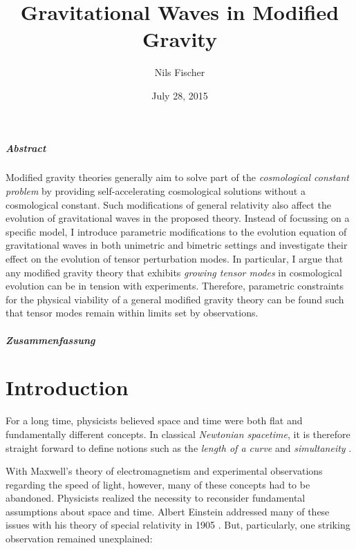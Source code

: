 \documentclass[12pt,parskip=half]{scrreprt}
\title{Gravitational Waves in Modified Gravity}
\author{Nils Fischer}
\date{July 28, 2015}
\begin{document}
\pagestyle{empty}





\cleardoublepage


\paragraph{Abstract}

Modified gravity theories generally aim to solve part of the \emph{cosmological constant problem} by providing self-accelerating cosmological solutions without a cosmological constant. Such modifications of general relativity also affect the evolution of gravitational waves in the proposed theory. Instead of focussing on a specific model, I introduce parametric modifications to the evolution equation of gravitational waves in both unimetric and bimetric settings and investigate their effect on the evolution of tensor perturbation modes. In particular, I argue that any modified gravity theory that exhibits \emph{growing tensor modes} in cosmological evolution can be in tension with experiments. Therefore, parametric constraints for the physical viability of a general modified gravity theory can be found such that tensor modes remain within limits set by observations.

\paragraph{Zusammenfassung}


\cleardoublepage

\tableofcontents


\cleardoublepage{}
\pagestyle{fancy}


\chapter{Introduction}\label{ch:intro}

For a long time, physicists believed space and time were both flat and fundamentally different concepts. In classical \emph{Newtonian spacetime}, it is therefore straight forward to define notions such as the \emph{length of a curve} and \emph{simultaneity} \autocite{Tolish}.

With Maxwell's theory of electromagnetism and experimental observations regarding the speed of light, however, many of these concepts had to be abandoned. Physicists realized the necessity to reconsider fundamental assumptions about space and time. Albert Einstein addressed many of these issues with his theory of special relativity in 1905 \autocite{Einstein1905}. But, particularly, one striking observation remained unexplained:
\end{document}
